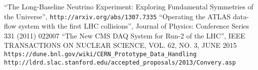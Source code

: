 \begin{thebibliography}{99}

 ``The Long-Baseline Neutrino Experiment: Exploring Fundamental Symmetries of the Universe'',  \verb!http://arxiv.org/abs/1307.7335!
 ``Operating the ATLAS data-flow system with the first LHC collisions'', Journal of Physics: Conference Series 331 (2011) 022007
 ``The New CMS DAQ System for Run-2 of the LHC'', IEEE TRANSACTIONS ON NUCLEAR SCIENCE, VOL. 62, NO. 3, JUNE 2015
 \verb!https://dune.bnl.gov/wiki/CERN_Prototype_Data_Handling!
 \verb!http://ldrd.slac.stanford.edu/accepted_proposals/2013/Convery.asp!
\end{thebibliography}